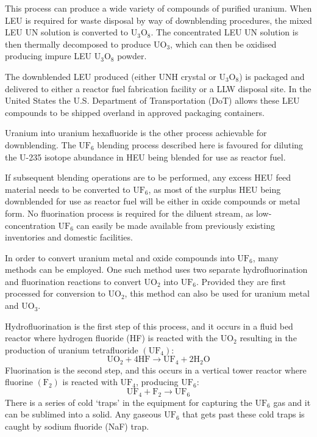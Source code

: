 \documentclass[twoside,titlepage,11pt,twocolumn,a4paper]{article}
\begin{document}
This process can produce a wide variety of compounds of purified
uranium. When LEU is required for waste disposal by way of
downblending procedures, the mixed LEU UN solution is converted to
\(\mathrm{U_3O_8}\). The concentrated LEU UN solution is then
thermally decomposed to produce \(\mathrm{UO_3}\), which can then be
oxidised producing impure LEU \(\mathrm{U_3O_8}\) powder.

The downblended LEU produced (either UNH crystal or
\(\mathrm{U_3O_8}\)) is packaged and delivered to either a reactor
fuel fabrication facility or a LLW disposal site. In the United States
the U.S. Department of Transportation (DoT) allows these LEU compounds
to be shipped overland in approved packaging containers.

Uranium into uranium hexafluoride is the other process achievable for
downblending.  The \(\mathrm{UF_6}\) blending process described here
is favoured for diluting the U-235 isotope abundance in HEU being
blended for use as reactor fuel.

If subsequent blending operations are to be performed, any excess HEU
feed material needs to be converted to \(\mathrm{UF_6}\), as most of
the surplus HEU being downblended for use as reactor fuel will be
either in oxide compounds or metal form. No fluorination process is
required for the diluent stream, as low-concentration
\(\mathrm{UF_6}\) can easily be made available from previously
existing inventories and domestic facilities.

In order to convert uranium metal and oxide compounds into
\(\mathrm{UF_6}\), many methods can be employed. One such method
uses two separate hydrofluorination and fluorination
reactions to convert \(\mathrm{UO_2}\) into
\(\mathrm{UF_6}\). Provided they are first processed for conversion to
\(\mathrm{UO_2}\), this method can also be used for uranium metal and
\(\mathrm{UO_3}\).

Hydrofluorination is the first step of this process, and it occurs in
a fluid bed reactor where hydrogen fluoride (HF) is reacted with the
\(\mathrm{UO_2}\) resulting in the production of uranium tetrafluoride
\(\mathrm{(UF_4)}\):
\[ \mathrm{ UO_2 + 4HF \rightarrow UF_4 + 2 H_2O } \]
Fluorination is the second step, and this occurs in a vertical tower
reactor where fluorine \(\mathrm{(F_2)}\) is reacted with
\(\mathrm{UF_4}\), producing \(\mathrm{UF_6}\):
\[ \mathrm{ UF_4 + F_2 \rightarrow UF_6 } \]
There is a series of cold `traps' in the equipment for capturing the
\(\mathrm{UF_6}\) gas and it can be sublimed into a solid. Any gaseous
\(\mathrm{UF_6}\) that gets past these cold traps is caught by sodium
fluoride (NaF) trap.
\end{document}
